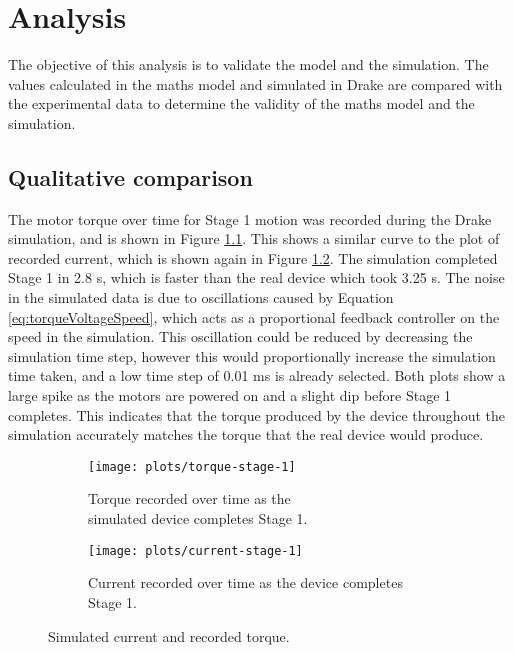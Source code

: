 \chapter{Analysis}

The objective of this analysis is to validate the model and the simulation. The values calculated in the maths model and simulated in Drake are compared with the experimental data to determine the validity of the maths model and the simulation.

\section{Qualitative comparison}

The motor torque over time for Stage 1 motion was recorded during the Drake simulation, and is shown in Figure \ref{fig:torque-stage-1}. This shows a similar curve to the plot of recorded current, which is shown again in Figure \ref{fig:current-2}. The simulation completed Stage 1 in 2.8 s, which is faster than the real device which took 3.25 s. The noise in the simulated data is due to oscillations caused by Equation \ref{eq:torqueVoltageSpeed}, which acts as a proportional feedback controller on the speed in the simulation. This oscillation could be reduced by decreasing the simulation time step, however this would proportionally increase the simulation time taken, and a low time step of 0.01 ms is already selected. Both plots show a large spike as the motors are powered on and a slight dip before Stage 1 completes. This indicates that the torque produced by the device throughout the simulation accurately matches the torque that the real device would produce.
\begin{figure}[!ht]
	\centering
	\begin{subfigure}{.5\textwidth}
		\centering
		\texttt{[image: plots/torque-stage-1]}
		\caption{Torque recorded over time as the \\simulated device completes Stage 1.}
		\label{fig:torque-stage-1}
	\end{subfigure}%
	\begin{subfigure}{.5\textwidth}
		\centering
		\texttt{[image: plots/current-stage-1]}
		\caption{Current recorded over time as the device completes Stage 1.}
		\label{fig:current-2}
	\end{subfigure}
	\caption{Simulated current and recorded torque.}
	\label{fig:torque-current}
\end{figure}



